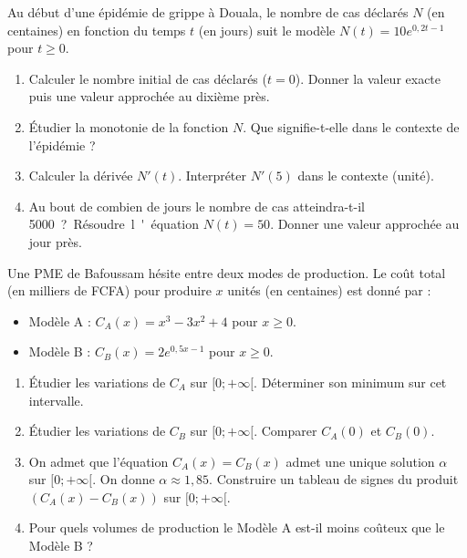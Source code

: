 \documentclass[11pt]{article}
\begin{document}
\begin{exercice}
Au début d'une épidémie de grippe à Douala, le nombre de cas déclarés $N$ (en centaines) en fonction du temps $t$ (en jours) suit le modèle $N(t) = 10 e^{0,2t - 1}$ pour $t \ge 0$.
\begin{enumerate}
    \item Calculer le nombre initial de cas déclarés ($t=0$). Donner la valeur exacte puis une valeur approchée au dixième près.
    \item Étudier la monotonie de la fonction $N$. Que signifie-t-elle dans le contexte de l'épidémie ?
    \item Calculer la dérivée $N'(t)$. Interpréter $N'(5)$ dans le contexte (unité).
    \item Au bout de combien de jours le nombre de cas atteindra-t-il \SI{5000} ? Résoudre l'équation $N(t) = 50$. Donner une valeur approchée au jour près.
\end{enumerate}
\end{exercice}

\begin{exercice}
Une PME de Bafoussam hésite entre deux modes de production. Le coût total (en milliers de FCFA) pour produire $x$ unités (en centaines) est donné par :
\begin{itemize}
    \item Modèle A : $C_A(x) = x^3 - 3x^2 + 4$ pour $x \ge 0$.
    \item Modèle B : $C_B(x) = 2e^{0,5x - 1}$ pour $x \ge 0$.
\end{itemize}
\begin{enumerate}
    \item Étudier les variations de $C_A$ sur $[0; +\infty[$. Déterminer son minimum sur cet intervalle.
    \item Étudier les variations de $C_B$ sur $[0; +\infty[$. Comparer $C_A(0)$ et $C_B(0)$.
    \item On admet que l'équation $C_A(x) = C_B(x)$ admet une unique solution $\alpha$ sur $[0; +\infty[$. On donne $\alpha \approx 1,85$.
    Construire un tableau de signes du produit $(C_A(x) - C_B(x))$ sur $[0; +\infty[$.
    \item Pour quels volumes de production le Modèle A est-il moins coûteux que le Modèle B ?
\end{enumerate}
\end{exercice}
\end{document}
